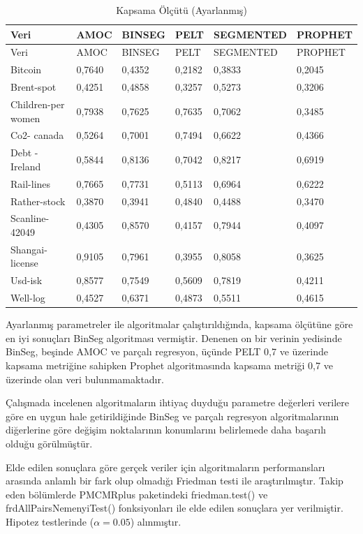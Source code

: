 \documentclass[12pt,twoside]{deuthesis}
\begin{document}
\begin{longtable}[]{@{}llllll@{}}
\caption{\label{tab:nvar5} Kapsama Ölçütü (Ayarlanmış)}\tabularnewline
\toprule\noalign{}
Veri & AMOC & BINSEG & PELT & SEGMENTED & PROPHET \\
\midrule\noalign{}
\endfirsthead
\toprule\noalign{}
Veri & AMOC & BINSEG & PELT & SEGMENTED & PROPHET \\
\midrule\noalign{}
\endhead
\bottomrule\noalign{}
\endlastfoot
Bitcoin & 0,7640 & 0,4352 & 0,2182 & 0,3833 & 0,2045 \\
Brent-spot & 0,4251 & 0,4858 & 0,3257 & 0,5273 & 0,3206 \\
Children-per women & 0,7938 & 0,7625 & 0,7635 & 0,7062 & 0,3485 \\
Co2- canada & 0,5264 & 0,7001 & 0,7494 & 0,6622 & 0,4366 \\
Debt -Ireland & 0,5844 & 0,8136 & 0,7042 & 0,8217 & 0,6919 \\
Rail-lines & 0,7665 & 0,7731 & 0,5113 & 0,6964 & 0,6222 \\
Rather-stock & 0,3870 & 0,3941 & 0,4840 & 0,4488 & 0,3470 \\
Scanline-42049 & 0,4305 & 0,8570 & 0,4157 & 0,7944 & 0,4097 \\
Shangai-license & 0,9105 & 0,7961 & 0,3955 & 0,8058 & 0,3625 \\
Usd-isk & 0,8577 & 0,7549 & 0,5609 & 0,7819 & 0,4211 \\
Well-log & 0,4527 & 0,6371 & 0,4873 & 0,5511 & 0,4615 \\
\end{longtable}

Ayarlanmış parametreler ile algoritmalar çalıştırıldığında, kapsama ölçütüne göre en iyi sonuçları BinSeg algoritması vermiştir. Denenen on bir verinin yedisinde BinSeg, beşinde AMOC ve parçalı regresyon, üçünde PELT 0,7 ve üzerinde kapsama metriğine sahipken Prophet algoritmasında kapsama metriği 0,7 ve üzerinde olan veri bulunmamaktadır.

Çalışmada incelenen algoritmaların ihtiyaç duyduğu parametre değerleri verilere göre en uygun hale getirildiğinde BinSeg ve parçalı regresyon algoritmalarının diğerlerine göre değişim noktalarının konumlarını belirlemede daha başarılı olduğu görülmüştür.

Elde edilen sonuçlara göre gerçek veriler için algoritmaların performansları arasında anlamlı bir fark olup olmadığı Friedman testi ile araştırılmıştır. Takip eden bölümlerde PMCMRplus paketindeki friedman.test() ve frdAllPairsNemenyiTest() fonksiyonları ile elde edilen sonuçlara yer verilmiştir. Hipotez testlerinde (\(\alpha=0.05\)) alınmıştır.
\end{document}
